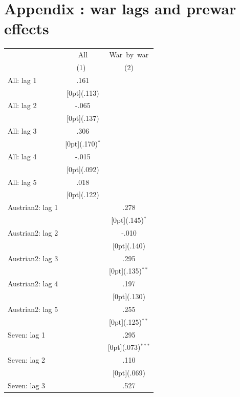 \documentclass[12pt,a4paper,titlepage]{article}
\begin{document}
\newpage
\appendix
\section{Appendix : war lags and prewar effects}

{

 \label{tab:title} 
\begin{tabular*}{\textwidth}{@{\extracolsep{\fill}}lcc}		
	& \multicolumn{1}{c}{All} &	\multicolumn{1}{c}{War~by~war} \\
\cline{2-3}		
	& \multicolumn{1}{c}{(1)\mbox{\ }} &	\multicolumn{1}{c}{(2)} \\
\hline		
All: lag 1 &	.161 &	\\
&	\raisebox{.7ex}[0pt]{\scriptsize (.113)} &	\\
All: lag 2 &	-.065 &	\\
&	\raisebox{.7ex}[0pt]{\scriptsize (.137)} &	\\
All: lag 3 &	.306 &	\\
&	\raisebox{.7ex}[0pt]{\scriptsize (.170)$^{*}$} &	\\
All: lag 4 &	-.015 &	\\
&	\raisebox{.7ex}[0pt]{\scriptsize (.092)} &	\\
All: lag 5 &	.018 &	\\
&	\raisebox{.7ex}[0pt]{\scriptsize (.122)} &	\\
Austrian2: lag 1 &	&	.278 \\
&	&	\raisebox{.7ex}[0pt]{\scriptsize (.145)$^{*}$} \\
Austrian2: lag 2 &	&	-.010 \\
&	&	\raisebox{.7ex}[0pt]{\scriptsize (.140)} \\
Austrian2: lag 3 &	&	.295 \\
&	&	\raisebox{.7ex}[0pt]{\scriptsize (.135)$^{**}$} \\
Austrian2: lag 4 &	&	.197 \\
&	&	\raisebox{.7ex}[0pt]{\scriptsize (.130)} \\
Austrian2: lag 5 &	&	.255 \\
&	&	\raisebox{.7ex}[0pt]{\scriptsize (.125)$^{**}$} \\
Seven: lag 1 &	&	.295 \\
&	&	\raisebox{.7ex}[0pt]{\scriptsize (.073)$^{***}$} \\
Seven: lag 2 &	&	.110 \\
&	&	\raisebox{.7ex}[0pt]{\scriptsize (.069)} \\
Seven: lag 3 &	&	.527 \\

\end{tabular*}}
\end{document}
